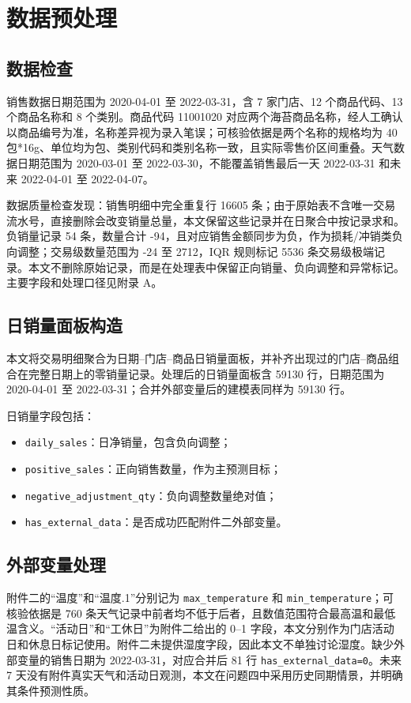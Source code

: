 \section{数据预处理}
\label{sec:data_preprocessing}

\subsection{数据检查}

销售数据日期范围为 2020-04-01 至 2022-03-31，含 7 家门店、12 个商品代码、13 个商品名称和 8 个类别。商品代码 11001020 对应两个海苔商品名称，经人工确认以商品编号为准，名称差异视为录入笔误；可核验依据是两个名称的规格均为 40包*16g、单位均为包、类别代码和类别名称一致，且实际零售价区间重叠。天气数据日期范围为 2020-03-01 至 2022-03-30，不能覆盖销售最后一天 2022-03-31 和未来 2022-04-01 至 2022-04-07。

数据质量检查发现：销售明细中完全重复行 16605 条；由于原始表不含唯一交易流水号，直接删除会改变销量总量，本文保留这些记录并在日聚合中按记录求和。负销量记录 54 条，数量合计 -94，且对应销售金额同步为负，作为损耗/冲销类负向调整；交易级数量范围为 -24 至 2712，IQR 规则标记 5536 条交易级极端记录。本文不删除原始记录，而是在处理表中保留正向销量、负向调整和异常标记。主要字段和处理口径见附录 A。

\subsection{日销量面板构造}

本文将交易明细聚合为日期--门店--商品日销量面板，并补齐出现过的门店--商品组合在完整日期上的零销量记录。处理后的日销量面板含 59130 行，日期范围为 2020-04-01 至 2022-03-31；合并外部变量后的建模表同样为 59130 行。

日销量字段包括：
\begin{itemize}
  \item \texttt{daily\_sales}：日净销量，包含负向调整；
  \item \texttt{positive\_sales}：正向销售数量，作为主预测目标；
  \item \texttt{negative\_adjustment\_qty}：负向调整数量绝对值；
  \item \texttt{has\_external\_data}：是否成功匹配附件二外部变量。
\end{itemize}

\subsection{外部变量处理}

附件二的“温度”和“温度.1”分别记为 \texttt{max\_temperature} 和 \texttt{min\_temperature}；可核验依据是 760 条天气记录中前者均不低于后者，且数值范围符合最高温和最低温含义。“活动日”和“工休日”为附件二给出的 0--1 字段，本文分别作为门店活动日和休息日标记使用。附件二未提供湿度字段，因此本文不单独讨论湿度。缺少外部变量的销售日期为 2022-03-31，对应合并后 81 行 \texttt{has\_external\_data=0}。未来 7 天没有附件真实天气和活动日观测，本文在问题四中采用历史同期情景，并明确其条件预测性质。
